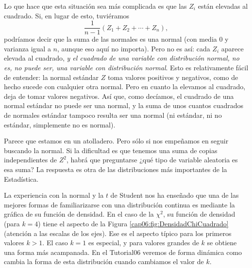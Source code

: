 Lo que hace que esta situación sea más complicada es que las $Z_i$ están
elevadas al cuadrado. Si, en lugar de esto, tuviéramos
    \[\dfrac{1}{n-1}(Z_1+Z_2+\cdots+Z_n),\]
podríamos decir que la suma de las normales es una normal (con media $0$ y
varianza igual a $n$, aunque eso aquí no importa). Pero no es así: cada $Z_i$
aparece elevada al cuadrado, {\em y el cuadrado de una variable con
distribución normal, no es, no puede ser, una variable con distribución
normal}. Esto es relativamente fácil de entender: la normal estándar $Z$ toma
valores positivos y negativos, como de hecho sucede con cualquier otra normal.
Pero en cuanto la elevamos al cuadrado, deja de tomar valores negativos. Así
que, como decíamos, el cuadrado de una normal estándar no puede ser una normal,
y la suma de unos cuantos cuadrados de normales estándar tampoco resulta ser
una normal (ni estándar, ni no estándar, simplemente no es normal).


Parece que estamos en un atolladero. Pero sólo si nos empeñamos en seguir
buscando la normal. Si la dificultad es que tenemos una suma de copias
independientes de $Z^2$, habrá que preguntarse ¿qué tipo de variable aleatoria
es esa suma? La respuesta es otra de las distribuciones más importantes de la
Estadística.

    \begin{center}
    \end{center}


La experiencia con la normal y la $t$ de Student nos ha enseñado que una de las
mejores formas de familiarizarse con una distribución continua es mediante la
gráfica de su función de densidad. En el caso de la $\chi^2$, su función de
densidad (para $k=4$) tiene el aspecto de la  Figura
\ref{cap06:fig:DensidadChiCuadrado} (atención a las escalas de los ejes). Ese
es el aspecto típico para los primeros valores $k>1$. El caso $k=1$ es
especial, y para valores grandes de $k$ se obtiene una forma más acampanada. En el Tutorial06 veremos de forma dinámica como cambia la forma de esta distribución cuando cambiamos el valor de $k$.

